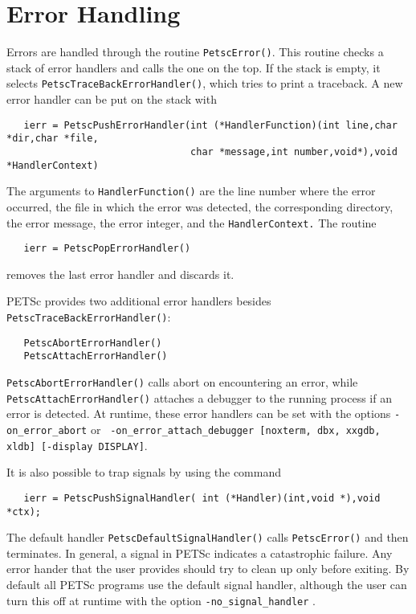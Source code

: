 \section{Error Handling}   

Errors are handled through the routine {\tt PetscError()}. 
 This routine
checks a stack of error handlers and calls the one on the top.  
If the stack is empty, it selects {\tt PetscTraceBackErrorHandler()}, 
which  tries to print a traceback. 
A new error handler can be put on the stack with
\begin{verbatim}
   ierr = PetscPushErrorHandler(int (*HandlerFunction)(int line,char *dir,char *file,
                                char *message,int number,void*),void *HandlerContext)
\end{verbatim}
The arguments to {\tt HandlerFunction()} are the line number where 
the error occurred, the file in which the error was detected, the corresponding
directory, the error message, the error integer, and the {\tt HandlerContext.}
The routine 
\begin{verbatim} 
   ierr = PetscPopErrorHandler()
\end{verbatim}
removes the last error handler and discards it. 

PETSc provides two additional error handlers besides 
{\tt PetscTraceBackErrorHandler()}:
 
\begin{verbatim}
   PetscAbortErrorHandler()
   PetscAttachErrorHandler()
\end{verbatim}
{\tt PetscAbortErrorHandler()} calls abort on encountering an error, while
{\tt PetscAttachErrorHandler()} attaches a debugger to the running process
if an error is detected. At runtime, these error handlers can be set
with the options {\tt -on\_error\_abort} or {\tt
-on\_error\_attach\_debugger [noxterm, dbx, xxgdb, xldb] [-display DISPLAY]}.

It is also possible to trap signals by using the 
command 
\begin{verbatim}
   ierr = PetscPushSignalHandler( int (*Handler)(int,void *),void *ctx);
\end{verbatim}
The default handler {\tt PetscDefaultSignalHandler()} 
calls  
{\tt PetscError()} and then terminates. In general, a signal in PETSc
indicates a catastrophic failure.  Any error hander that the user provides
should try to clean up only before exiting.  By default all PETSc programs
use the default signal handler, although the user can turn this off 
at runtime with the 
option {\tt -no\_signal\_handler} .

